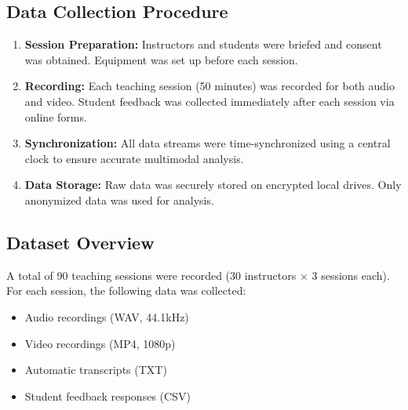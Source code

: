 \subsection{Data Collection Procedure}
\begin{enumerate}
    \item \textbf{Session Preparation:} Instructors and students were briefed and consent was obtained. Equipment was set up before each session.
    \item \textbf{Recording:} Each teaching session (50 minutes) was recorded for both audio and video. Student feedback was collected immediately after each session via online forms.
    \item \textbf{Synchronization:} All data streams were time-synchronized using a central clock to ensure accurate multimodal analysis.
    \item \textbf{Data Storage:} Raw data was securely stored on encrypted local drives. Only anonymized data was used for analysis.
\end{enumerate}

\subsection{Dataset Overview}
A total of 90 teaching sessions were recorded (30 instructors × 3 sessions each). For each session, the following data was collected:
\begin{itemize}
    \item Audio recordings (WAV, 44.1kHz)
    \item Video recordings (MP4, 1080p)
    \item Automatic transcripts (TXT)
    \item Student feedback responses (CSV)
\end{itemize}

